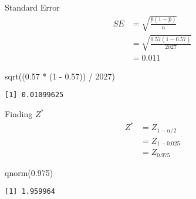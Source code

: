 \documentclass[
  ignorenonframetext,
]{beamer}
\newenvironment{Shaded}{\begin{snugshade}}{\end{snugshade}}
\newcommand{\DecValTok}[1]{\textcolor[rgb]{0.68,0.00,0.00}{#1}}
\newcommand{\FloatTok}[1]{\textcolor[rgb]{0.68,0.00,0.00}{#1}}
\newcommand{\FunctionTok}[1]{\textcolor[rgb]{0.28,0.35,0.67}{#1}}
\newcommand{\NormalTok}[1]{\textcolor[rgb]{0.00,0.23,0.31}{#1}}
\newcommand{\SpecialCharTok}[1]{\textcolor[rgb]{0.37,0.37,0.37}{#1}}
\begin{document}
\begin{frame}[fragile]{Standard Error}
\label{standard-error}
\[
\begin{aligned}
SE&=\sqrt{\frac{\hat{p}(1-\hat{p})}{n}} \\
&= \sqrt{\frac{0.57(1-0.57)}{2027}} \\
&=0.011
\end{aligned}
\]

\pause

\begin{Shaded}
\begin{Highlighting}[]
\FunctionTok{sqrt}\NormalTok{((}\FloatTok{0.57} \SpecialCharTok{*}\NormalTok{ (}\DecValTok{1} \SpecialCharTok{{-}} \FloatTok{0.57}\NormalTok{)) }\SpecialCharTok{/} \DecValTok{2027}\NormalTok{)}
\end{Highlighting}
\end{Shaded}

\begin{verbatim}
[1] 0.01099625
\end{verbatim}
\end{frame}

\begin{frame}[fragile]{Finding \(Z^*\)}
\label{finding-z}
\[
\begin{aligned}
Z^*&=Z_{1-\alpha/2} \\
&=Z_{1-0.025} \\
&=Z_{0.975}
\end{aligned}
\]

\pause

\begin{Shaded}
\begin{Highlighting}[]
\FunctionTok{qnorm}\NormalTok{(}\FloatTok{0.975}\NormalTok{)}
\end{Highlighting}
\end{Shaded}

\begin{verbatim}
[1] 1.959964
\end{verbatim}
\end{frame}
\end{document}

